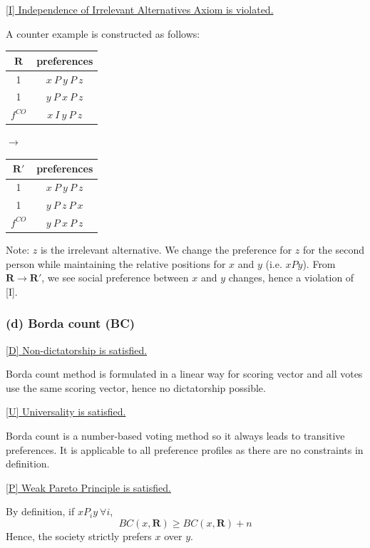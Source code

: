 \documentclass[a4paper]{article}
\begin{document}
\underline{[I] Independence of Irrelevant Alternatives Axiom is violated.}

A counter example is constructed as follows:

\begin{table}[!htbp]
    \centering
    \begin{tabular}{c|c|}
        $\mathbf{R}$ & preferences         \\ 
        \hline
        1  & $x\: P\: y\: P\: z$ \\
        1  & $y\: P\: x\: P\: z$ \\
        \hline 
        $f^{CO}$ & $x\: I\: y\: P\: z$
    \end{tabular}
    \qquad $\to$ \qquad
    \centering
    \begin{tabular}{c|c|}
        $\mathbf{R'}$ & preferences         \\ 
        \hline
        1  & $x\: P\: y\: P\: z$ \\
        1  & $y\: P\: z\: P\: x$ \\
        \hline 
        $f^{CO}$ & $y\: P\: x\: P\: z$
    \end{tabular}
\end{table}

Note: $z$ is the irrelevant alternative. We change the preference for $z$ for the second person while maintaining the relative positions for $x$ and $y$ (i.e. $xPy$). From $\mathbf{R}\to\mathbf{R'}$, we see social preference between $x$ and $y$ changes, hence a violation of [I].

\subsubsection*{(d) Borda count (BC)}

\underline{[D] Non-dictatorship is satisfied.} 

Borda count method is formulated in a linear way for scoring vector and all votes use the same scoring vector, hence no dictatorship possible.

\underline{[U] Universality is satisfied.}

Borda count is a number-based voting method so it always leads to transitive preferences. It is applicable to all preference profiles as there are no constraints in definition.

\underline{[P] Weak Pareto Principle is satisfied.}

By definition, if $xP_i y\:\forall i$, 
\[BC(x, \mathbf{R})\geq BC(x, \mathbf{R}) + n \]
Hence, the society strictly prefers $x$ over $y$.
\end{document}
